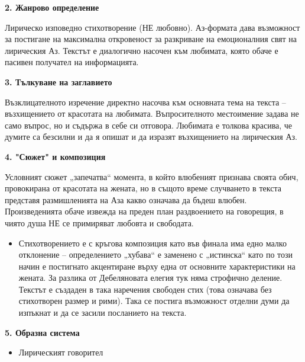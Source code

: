 \documentclass[12pt,a4paper]{article}
\begin{document}
\noindent 
\textbf{2. Жанрово определение}
\vspace{0.1cm}
 
\indent Лирическо изповедно стихотворение (НЕ любовно). Аз-формата дава възможност за постигане на максимална откровеност за разкриване на емоционалния свят на лирическия Аз. Текстът е диалогично насочен към любимата, която обаче е пасивен получател на информацията.

\vspace{0.1cm}
 
\noindent 
\textbf{3. Тълкуване на заглавието}
\vspace{0.1cm}
 
\indent Възклицателното изречение директно насочва към основната тема на текста – възхищението от красотата на любимата. Въпросителното местоимение задава не само въпрос, но и съдържа в себе си отговора. Любимата е толкова красива, че думите са безсилни и да я опишат и да изразят възхищението на лирическия Аз.

\vspace{0.1cm}
 
\noindent 
\textbf{4. "Сюжет" и композиция}
\vspace{0.1cm}
 
\indent Условният сюжет „запечатва“ момента, в който влюбеният признава своята обич, провокирана от красотата на жената, но в същото време случването в текста представя размишленията на Аза какво означава да бъдеш влюбен. Произведенията обаче извежда на преден план раздвоението на говорещия, в чиято душа НЕ се примиряват любовта и свободата. 

\begin{itemize}[leftmargin=*]
\vspace{-0.2cm}
\item Стихотворението е с кръгова композиция като във финала има едно малко отклонение – определението „хубава“ е заменено с „истинска“ като по този начин е постигнато акцентиране върху една от основните характеристики на жената. За разлика от Дебеляновата елегия тук няма строфично деление. Текстът е създаден в така наречения свободен стих (това означава без стихотворен размер и рими). Така се постига възможност отделни думи да изпъкнат и да се засили посланието на текста.
\end{itemize}

\vspace{0.1cm}
 
\noindent 
\textbf{5. Образна система}
\begin{itemize}[leftmargin=*]
\vspace{-0.2cm}
\item Лирическият говорител
\end{itemize}
\end{document}
